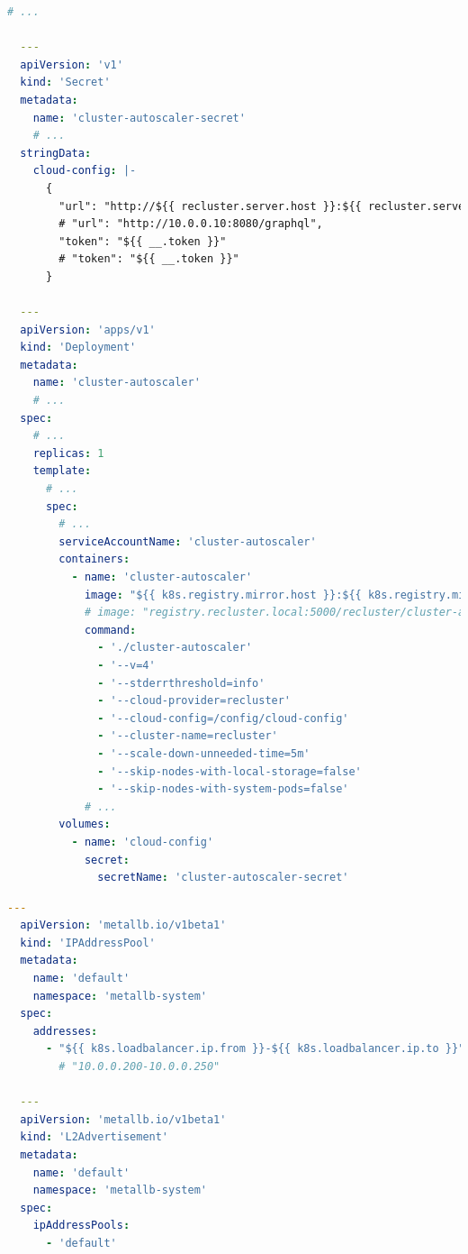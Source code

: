 \begin{lstlisting}[language=yaml, alsoletter={.-1}, morekeywords={1}, morekeywords={[2]{apiVersion, kind, metadata, name, namespace, stringData, cloud-config, labels, app, spec, replicas, selector, matchLabels, template, serviceAccountName, tolerations, containers, image, command, volumeMounts, mountPath, readOnly, volumes, secret, secretName}}, xleftmargin=\parindent, label={lst:k8s_autoscaler_deployment}, caption=TODO]
  # ...

  ---
  apiVersion: 'v1'
  kind: 'Secret'
  metadata:
    name: 'cluster-autoscaler-secret'
    # ...
  stringData:
    cloud-config: |-
      {
        "url": "http://${{ recluster.server.host }}:${{ recluster.server.port }}                                /${{ recluster.server.path }}",
        # "url": "http://10.0.0.10:8080/graphql",
        "token": "${{ __.token }}"
        # "token": "${{ __.token }}"
      }

  ---
  apiVersion: 'apps/v1'
  kind: 'Deployment'
  metadata:
    name: 'cluster-autoscaler'
    # ...
  spec:
    # ...
    replicas: 1
    template:
      # ...
      spec:
        # ...
        serviceAccountName: 'cluster-autoscaler'
        containers:
          - name: 'cluster-autoscaler'
            image: "${{ k8s.registry.mirror.host }}:${{ k8s.registry.mirror.port }}/recluster                       /cluster-autoscaler"
            # image: "registry.recluster.local:5000/recluster/cluster-autoscaler"
            command:
              - './cluster-autoscaler'
              - '--v=4'
              - '--stderrthreshold=info'
              - '--cloud-provider=recluster'
              - '--cloud-config=/config/cloud-config'
              - '--cluster-name=recluster'
              - '--scale-down-unneeded-time=5m'
              - '--skip-nodes-with-local-storage=false'
              - '--skip-nodes-with-system-pods=false'
            # ...
        volumes:
          - name: 'cloud-config'
            secret:
              secretName: 'cluster-autoscaler-secret'
\end{lstlisting}

\begin{lstlisting}[language=yaml, alsoletter={.}, morekeywords={[2]{apiVersion, kind, metadata, name, namespace, spec, addresses, ipAddressPools}}, xleftmargin=\parindent, label={lst:k8s_metallb_config}, caption=TODO]
  ---
  apiVersion: 'metallb.io/v1beta1'
  kind: 'IPAddressPool'
  metadata:
    name: 'default'
    namespace: 'metallb-system'
  spec:
    addresses:
      - "${{ k8s.loadbalancer.ip.from }}-${{ k8s.loadbalancer.ip.to }}"
        # "10.0.0.200-10.0.0.250"

  ---
  apiVersion: 'metallb.io/v1beta1'
  kind: 'L2Advertisement'
  metadata:
    name: 'default'
    namespace: 'metallb-system'
  spec:
    ipAddressPools:
      - 'default'
\end{lstlisting}

